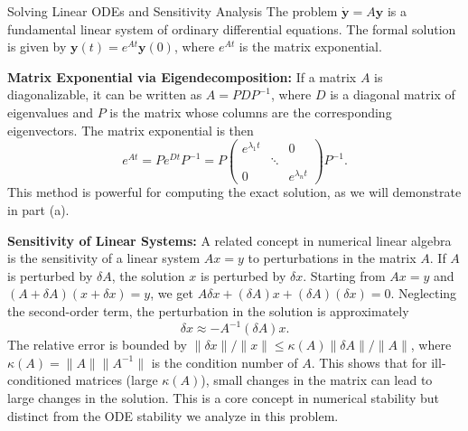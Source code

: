 \begin{solution}
\begin{remarkbox}{Solving Linear ODEs and Sensitivity Analysis}
The problem $\dot{\mathbf{y}} = A\mathbf{y}$ is a fundamental linear system of ordinary differential equations. The formal solution is given by $\mathbf{y}(t) = e^{At} \mathbf{y}(0)$, where $e^{At}$ is the matrix exponential.

\textbf{Matrix Exponential via Eigendecomposition:} If a matrix $A$ is diagonalizable, it can be written as $A = PDP^{-1}$, where $D$ is a diagonal matrix of eigenvalues and $P$ is the matrix whose columns are the corresponding eigenvectors. The matrix exponential is then
\[ e^{At} = P e^{Dt} P^{-1} = P \begin{pmatrix} e^{\lambda_1 t} & & 0 \\ & \ddots & \\ 0 & & e^{\lambda_n t} \end{pmatrix} P^{-1}. \]
This method is powerful for computing the exact solution, as we will demonstrate in part (a).

\textbf{Sensitivity of Linear Systems:} A related concept in numerical linear algebra is the sensitivity of a linear system $Ax=y$ to perturbations in the matrix $A$. If $A$ is perturbed by $\delta A$, the solution $x$ is perturbed by $\delta x$. Starting from $A x = y$ and $(A+\delta A)(x+\delta x)=y$, we get $A\delta x + (\delta A)x + (\delta A)(\delta x) = 0$. Neglecting the second-order term, the perturbation in the solution is approximately
\[ \delta x \approx -A^{-1}(\delta A)x. \]
The relative error is bounded by $\|\delta x\|/\|x\| \leq \kappa(A) \|\delta A\|/\|A\|$, where $\kappa(A) = \|A\|\|A^{-1}\|$ is the condition number of $A$. This shows that for ill-conditioned matrices (large $\kappa(A)$), small changes in the matrix can lead to large changes in the solution. This is a core concept in numerical stability but distinct from the ODE stability we analyze in this problem.
\end{remarkbox}


\end{solution}
